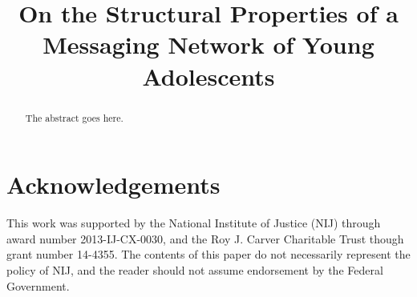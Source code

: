 \documentclass[conference]{IEEEtran}
\begin{document}
\title{On the Structural Properties of a Messaging Network of Young Adolescents}


\author{
\and
{}
\and
{}

}
\maketitle

\begin{abstract}
The abstract goes here.
\end{abstract}

\IEEEpeerreviewmaketitle






\section*{Acknowledgements}
This work was supported by the National Institute of Justice (NIJ) through award number 2013-IJ-CX-0030, and the Roy J. Carver Charitable Trust though grant number 14-4355. 
The contents of this paper do not necessarily represent the policy of NIJ, and the reader should not assume endorsement by the Federal Government. 



\end{document}
